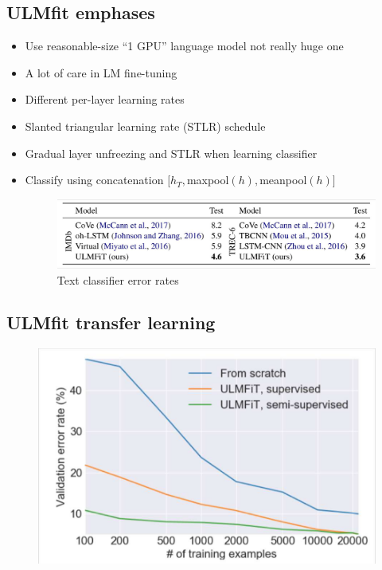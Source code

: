 \subsection{ULMfit emphases}
\begin{itemize}
\item Use reasonable-size ``1 GPU'' language model not really huge one
\item A lot of care in LM fine-tuning
\item Different per-layer learning rates
\item Slanted triangular learning rate (STLR) schedule
\item Gradual layer unfreezing and STLR when learning classifier
\item Classify using concatenation $[h_T, $maxpool$(h),$meanpool$(h)]$

\begin{figure}[h]
        	\includegraphics[scale = 0.2]{pics/ulmfit3.png}
        	Text classifier error rates
        \end{figure}  

\end{itemize}


\subsection{ULMfit transfer learning}

\begin{figure}[h]
        	\includegraphics[scale = 0.3]{pics/ulmfit4.png}
        \end{figure}  



